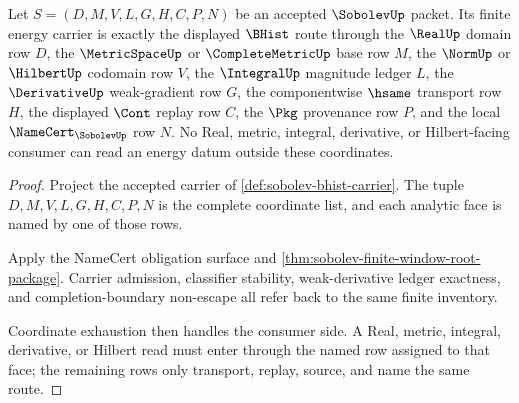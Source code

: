 \begin{theorem}
\label{thm:sobolev-finite-energy-carrier}
Let $S=(D,M,V,L,G,H,C,P,N)$ be an accepted $\SobolevUp$ packet. Its finite energy carrier is exactly the displayed $\BHist$ route through the $\RealUp$ domain row $D$, the $\MetricSpaceUp$ or $\CompleteMetricUp$ base row $M$, the $\NormUp$ or $\HilbertUp$ codomain row $V$, the $\IntegralUp$ magnitude ledger $L$, the $\DerivativeUp$ weak-gradient row $G$, the componentwise $\hsame$ transport row $H$, the displayed $\Cont$ replay row $C$, the $\Pkg$ provenance row $P$, and the local $\NameCert_{\SobolevUp}$ row $N$. No Real, metric, integral, derivative, or Hilbert-facing consumer can read an energy datum outside these coordinates.
\end{theorem}
\begin{proof}
Project the accepted carrier of \autoref{def:sobolev-bhist-carrier}. The tuple $D,M,V,L,G,H,C,P,N$ is the complete coordinate list, and each analytic face is named by one of those rows.

Apply the NameCert obligation surface and \autoref{thm:sobolev-finite-window-root-package}. Carrier admission, classifier stability, weak-derivative ledger exactness, and completion-boundary non-escape all refer back to the same finite inventory.

Coordinate exhaustion then handles the consumer side. A Real, metric, integral, derivative, or Hilbert read must enter through the named row assigned to that face; the remaining rows only transport, replay, source, and name the same route.
\end{proof}

